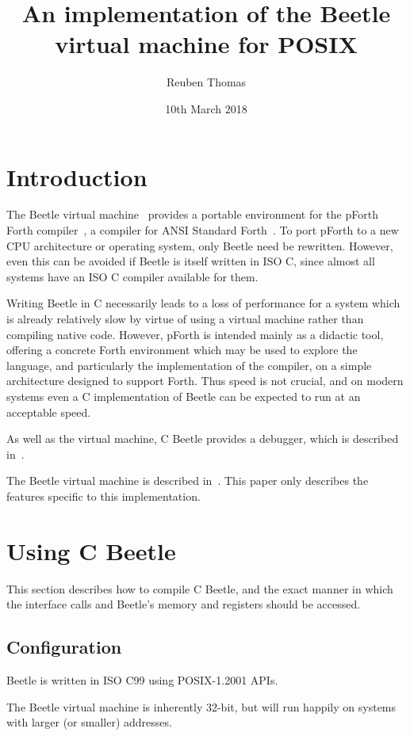 \documentclass[english]{article}
\title{An implementation of the Beetle virtual machine for POSIX}
\author{Reuben Thomas}
\date{10th March 2018}
\begin{document}
\maketitle


\section{Introduction}

The Beetle virtual machine~\cite{beetle} provides a portable environment
for the pForth Forth compiler~\cite{beetledis}, a compiler for ANSI Standard
Forth~\cite{ANSIforth}. To port pForth to a new CPU architecture or operating system, only Beetle need be rewritten. However, even this can be
avoided if Beetle is itself written in ISO C, since almost all systems have
an ISO C compiler available for them.

Writing Beetle in C necessarily leads to a loss of performance for a system
which is already relatively slow by virtue of using a virtual machine
rather than compiling native code. However, pForth is intended mainly as a
didactic tool, offering a concrete Forth environment which may be used to
explore the language, and particularly the implementation of the compiler, on
a simple architecture designed to support Forth. Thus speed is not crucial,
and on modern systems even a C implementation of Beetle can be expected to
run at an acceptable speed.

As well as the virtual machine, C Beetle provides a debugger, which is described in~\cite{beetleuiface}.

The Beetle virtual machine is described in~\cite{beetle}. This paper only
describes the features specific to this implementation.


\section{Using C Beetle}

This section describes how to compile C Beetle, and the exact manner in which
the interface calls and Beetle's memory and registers should be accessed.


\subsection{Configuration}
\label{configuration}

Beetle is written in ISO C99 using POSIX-1.2001 APIs.

The Beetle virtual machine is inherently 32-bit, but will run happily on systems with larger (or smaller) addresses.
\end{document}
